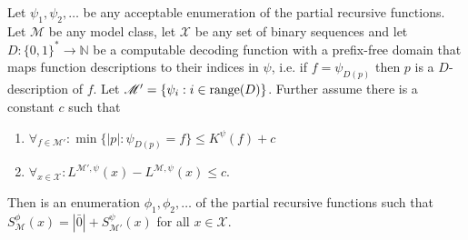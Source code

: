 \documentclass{style/llncs}
\newcommand{\M}{\mathscr M}
\newcommand{\X}{\mathscr X}
\newcommand{\N}{\mathbb N}
\newcommand{\tn}[1]{\textnormal{#1}}
\begin{document}
\begin{lemma}\label{lem:thecoolone}
  Let $\psi_1,\psi_2,\ldots$ be any acceptable enumeration of the partial recursive functions.
  Let $\M$ be any model class, let $\X$ be any set of binary sequences and let $D:\{0,1\}^*\to\N$ be a computable decoding function with a prefix-free domain that maps function descriptions to their indices in $\psi$, i.e. if $f=\psi_{D(p)}$ then $p$ is a $D$-description of $f$. Let $\M'=\{\psi_i:i\in\tn{range}(D)\}$. Further assume there is a constant $c$ such that
\begin{enumerate}
  \item $\forall_{f\in\M'}:\min\{|p|:\psi_{D(p)}=f\}\le K^\psi(f)+c$
  \item $\forall_{x\in\X}:L^{\M',\psi}(x)-L^{\M,\psi}(x)\le c$.
\end{enumerate}
Then is an enumeration $\phi_1,\phi_2,\ldots$ of the partial recursive functions such that $S^\phi_{\M}(x) = |\bar 0|+S^\psi_{\M'}(x)$ for all $x\in\X$.
\end{lemma}
\end{document}
